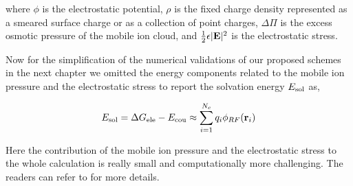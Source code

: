 where $\phi$ is the electrostatic potential, $\rho$ is the fixed charge density represented as a smeared surface charge or as a collection of point charges, $\Delta\Pi$ is  the excess osmotic pressure of the mobile ion cloud, and $\frac{1}{2}\epsilon|{\bf E}|^2$ is the electrostatic stress.

Now for the simplification of the numerical validations of our proposed schemes in the next chapter we omitted the energy components related to the mobile ion pressure and the electrostatic stress to report the solvation energy $E_{\rm sol}$ as,  

\begin{eqnarray}
	E_{\rm sol}=\Delta G_{\rm ele}-E_{\rm cou}\approx\sum\limits_{i=1}^{N_c}q_i\phi_{RF} ({\bf r}_i)\label{eq_solvation}
\end{eqnarray}

Here the contribution of the mobile ion pressure and the electrostatic stress to the whole calculation is really small and computationally more challenging. The readers can refer to \cite{GENG_WEI2011,Gilson,Sharp_Honig} for more details.	
